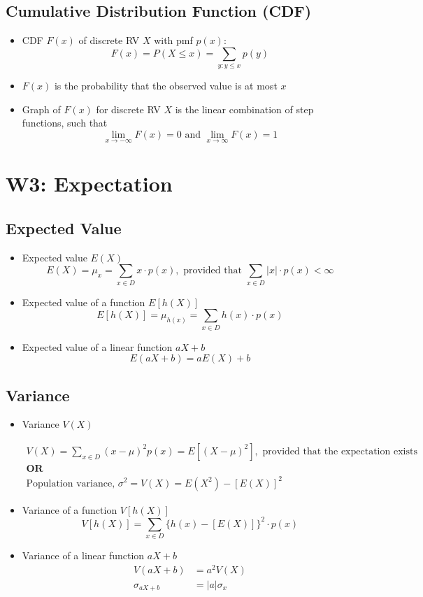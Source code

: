 \documentclass[a4paper]{article}
\begin{document}
\subsection{Cumulative Distribution Function (CDF)}
\begin{itemize}
    \item CDF $F(x)$ of discrete RV $X$ with pmf $p(x):$
    $$F(x) = P(X\leq x) = \sum_{y: y\leq x}p(y)
    $$
    \item $F(x)$ is the probability that the observed value is at most $x$
    \item Graph of $F(x)$ for discrete RV $X$ is the linear combination of step functions, such that
    $$
    \lim_{x\to -\infty}F(x) = 0\text{ and }\lim_{x\to\infty}F(x) = 1
    $$
\end{itemize}
\newpage
\section{W3: Expectation}
\subsection{Expected Value}
\begin{itemize}
    \item Expected value $E(X)$
    $$E(X) = \mu_{x} = \sum_{x\in D}x\cdot p(x), \text{ provided that }\sum_{x \in D}|x|\cdot p(x) < \infty
    $$
    \item Expected value of a function $E[h(X)]$
    $$E[h(X)] = \mu_{h(x)} = \sum_{x\in D}h(x)\cdot p(x)
    $$
    \item Expected value of a linear function $aX + b$
    $$E(aX+b) = aE(X) + b
    $$
\end{itemize}
\subsection{Variance}
\begin{itemize}
    \item Variance $V(X)$
    \begin{center}
        $\begin{matrix}
        V(X) = \sum_{x\in D}(x-\mu)^{2}p(x) = E[(X-\mu)^2], \text{ provided that the expectation exists}\\
        \textbf{OR}\\
        \text{Population variance, }\sigma^2 = V(X) = E(X^2)-[E(X)]^2
        \end{matrix}$
    \end{center}
    \item Variance of a function $V[h(X)]$
    $$V[h(X)] = \sum_{x\in D}\{h(x)-[E(X)]\}^{2}\cdot p(x)
    $$
    \item Variance of a linear function $aX + b$
    \begin{align*}
        V(aX + b) &= a^{2}V(X)\\
        \sigma_{aX+b} &= |a|\sigma_{x}
    \end{align*}
\end{itemize}
\end{document}
